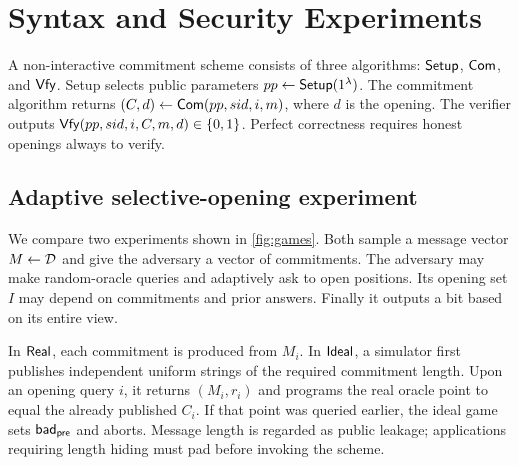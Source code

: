 \section{Syntax and Security Experiments}
\label{sec:syntax}

A non-interactive commitment scheme consists of three algorithms:
$\mathsf{Setup}$, $\mathsf{Com}$, and $\mathsf{Vfy}$.  Setup selects public parameters
$pp\leftarrow\mathsf{Setup}(1^\lambda)$.  The commitment algorithm returns
$(C,d)\leftarrow\mathsf{Com}(pp,sid,i,m)$, where $d$ is the opening.  The verifier
outputs $\mathsf{Vfy}(pp,sid,i,C,m,d)\in\{0,1\}$.  Perfect correctness requires
honest openings always to verify.

\subsection{Adaptive selective-opening experiment}

We compare two experiments shown in \cref{fig:games}.  Both sample a message
vector $M\leftarrow\mathcal{D}$ and give the adversary a vector of
commitments.  The adversary may make random-oracle queries and adaptively ask
to open positions.  Its opening set $I$ may depend on commitments and prior
answers.  Finally it outputs a bit based on its entire view.

In $\mathsf{Real}$, each commitment is produced from $M_i$.  In $\mathsf{Ideal}$, a simulator
first publishes independent uniform strings of the required commitment length.
Upon an opening query $i$, it returns $(M_i,r_i)$ and programs
the real oracle point to equal the already published $C_i$.  If that point was
queried earlier, the ideal game sets $\mathsf{bad}_{\mathsf{pre}}$ and aborts.  Message
length is regarded as public leakage; applications requiring length hiding
must pad before invoking the scheme.


